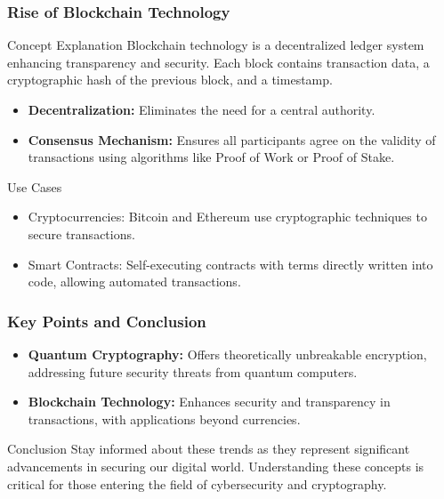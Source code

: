 \documentclass{beamer}
\begin{document}
\begin{frame}[fragile]
    \frametitle{Rise of Blockchain Technology}
    \begin{block}{Concept Explanation}
        Blockchain technology is a decentralized ledger system enhancing transparency and security. 
        Each block contains transaction data, a cryptographic hash of the previous block, and a timestamp.
    \end{block}
    
    \begin{itemize}
        \item \textbf{Decentralization:} Eliminates the need for a central authority.
        \item \textbf{Consensus Mechanism:} Ensures all participants agree on the validity of transactions using algorithms like Proof of Work or Proof of Stake.
    \end{itemize}

    \begin{block}{Use Cases}
        \begin{itemize}
            \item Cryptocurrencies: Bitcoin and Ethereum use cryptographic techniques to secure transactions.
            \item Smart Contracts: Self-executing contracts with terms directly written into code, allowing automated transactions.
        \end{itemize}
    \end{block}
\end{frame}

\begin{frame}[fragile]
    \frametitle{Key Points and Conclusion}
    \begin{itemize}
        \item \textbf{Quantum Cryptography:} Offers theoretically unbreakable encryption, addressing future security threats from quantum computers.
        \item \textbf{Blockchain Technology:} Enhances security and transparency in transactions, with applications beyond currencies.
    \end{itemize}
    
    \begin{block}{Conclusion}
        Stay informed about these trends as they represent significant advancements in securing our digital world. 
        Understanding these concepts is critical for those entering the field of cybersecurity and cryptography.
    \end{block}
\end{frame}
\end{document}
